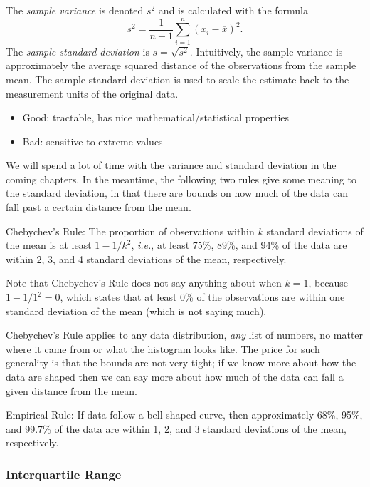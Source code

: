 \documentclass[captions=tableheading]{scrbook}
\begin{document}
The \emph{sample variance} is denoted \(s^{2}\) and is calculated with the formula
\begin{equation}
s^{2}=\frac{1}{n-1}\sum_{i=1}^{n}(x_{i}-\overline{x})^{2}.
\end{equation}
The \emph{sample standard deviation} is \(s=\sqrt{s^{2}}\). Intuitively, the sample variance is approximately the average squared distance of the observations from the sample mean. The sample standard deviation is used to scale the estimate back to the measurement units of the original data.
\begin{itemize}
\item Good: tractable, has nice mathematical/statistical properties
\item Bad: sensitive to extreme values
\end{itemize}
We will spend a lot of time with the variance and standard deviation in the coming chapters. In the meantime, the following two rules give some meaning to the standard deviation, in that there are bounds on how much of the data can fall past a certain distance from the mean.

\begin{fact}
Chebychev's Rule: The proportion of observations within \(k\) standard deviations of the mean is at least \(1-1/k^{2}\), \emph{i.e.}, at least 75\%, 89\%, and 94\% of the data are within 2, 3, and 4 standard deviations of the mean, respectively.
\end{fact}

Note that Chebychev's Rule does not say anything about when \(k=1\), because \(1-1/1^{2}=0\), which states that at least 0\% of the observations are within one standard deviation of the mean (which is not saying much).

Chebychev's Rule applies to any data distribution, \emph{any} list of numbers, no matter where it came from or what the histogram looks like. The price for such generality is that the bounds are not very tight; if we know more about how the data are shaped then we can say more about how much of the data can fall a given distance from the mean.

\begin{fact}
\label{fac:Empirical-Rule}
Empirical Rule: If data follow a bell-shaped curve, then approximately 68\%, 95\%, and 99.7\% of the data are within 1, 2, and 3 standard deviations of the mean, respectively. 
\end{fact}
\subsubsection{Interquartile Range}
\label{sec-2-3-4-2}
\end{document}
